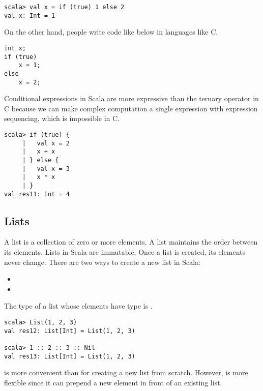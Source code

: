 \begin{verbatim}
scala> val x = if (true) 1 else 2
val x: Int = 1
\end{verbatim}

On the other hand, people write code like below in languages like C.

\begin{verbatim}
int x;
if (true)
    x = 1;
else
    x = 2;
\end{verbatim}

Conditional expressions in Scala are more expressive than the ternary operator
in C because we can make complex computation a single expression with expression
sequencing, which is impossible in C.

\begin{verbatim}
scala> if (true) {
     |   val x = 2
     |   x + x
     | } else {
     |   val x = 3
     |   x * x
     | }
val res11: Int = 4
\end{verbatim}

\subsection{Lists}

A list is a collection of zero or more elements. A list maintains the order between
its elements. Lists in Scala are immutable. Once a list is created, its elements
never change. There are two ways to create a new list in Scala:

\begin{itemize}
  \item {}
  \item {}
\end{itemize}

The type of a list whose elements have type  is .

\begin{verbatim}
scala> List(1, 2, 3)
val res12: List[Int] = List(1, 2, 3)

scala> 1 :: 2 :: 3 :: Nil
val res13: List[Int] = List(1, 2, 3)
\end{verbatim}

 is more convenient than \code{::} for creating a new list from
scratch. However, \code{::} is more flexible since it can prepend a new element
in front of an existing list.

